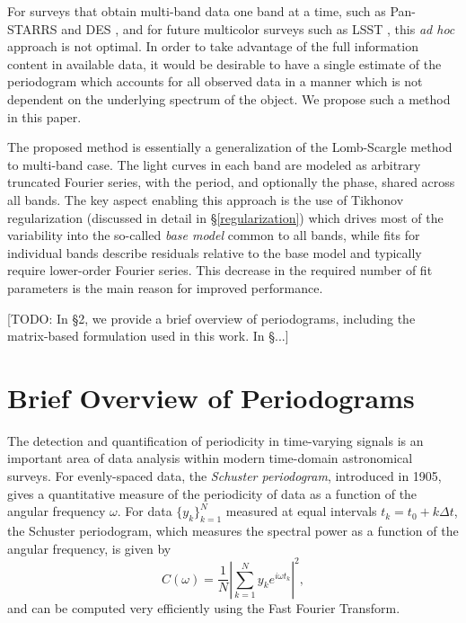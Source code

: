 \documentclass[12pt,preprint]{aastex}
\newcommand{\todo}[1]{{\color{red} [TODO: #1]}}
\newcommand{\foreign}[1]{{\it #1}}
\newcommand{\adhoc}{\foreign{ad hoc}}
\newcommand{\eqlabel}[1]{\label{eq:#1}}
\begin{document}
For surveys that obtain multi-band data one band at a time, such as Pan-STARRS \citep{Kaiser2010} and DES \citep{Flaugher08},
and for future multicolor surveys such as LSST \citep{Ivezic08LSST}, this \adhoc{} approach is not optimal. In order to take 
advantage of the full information content in available data, it would be desirable to have a single estimate of the periodogram 
which accounts for all observed data in a manner which is not dependent on the underlying spectrum of the object. 
We propose such a method in this paper. 

The proposed method is essentially a generalization of the Lomb-Scargle method to 
multi-band case. The light curves in  each band are modeled as arbitrary truncated Fourier series, 
with the period, and optionally the phase, shared across all bands. The key aspect enabling this approach is the use of Tikhonov regularization 
(discussed in detail in \S \ref{regularization}) which drives most of the variability into the so-called {\it base 
model} common to all bands, while fits for individual bands describe residuals relative to the base model 
and typically require lower-order Fourier series. This decrease in the required number of fit parameters is the
main reason for improved performance. 

\todo{In \S 2, we provide a brief overview of periodograms, including the matrix-based formulation used in this work. In \S...}



\section{Brief Overview of Periodograms \label{sec:periodograms}} 

The detection and quantification of periodicity in time-varying signals is an important area of data analysis within modern time-domain astronomical surveys.
For evenly-spaced data, the {\it Schuster periodogram}, introduced in 1905, gives a quantitative measure of the periodicity of data as a function of the angular frequency $\omega$. For data $\{y_k\}_{k=1}^N$ measured at equal intervals $t_k = t_0 + k\Delta t$, the Schuster periodogram, which measures the spectral power as a function of the angular frequency, is given by
\begin{equation}
  \eqlabel{Schuster}
  C(\omega) = \frac{1}{N}\left| \sum_{k=1}^N y_k e^{i\omega t_k} \right|^2,
\end{equation}
and can be computed very efficiently using the Fast Fourier Transform.
\end{document}
